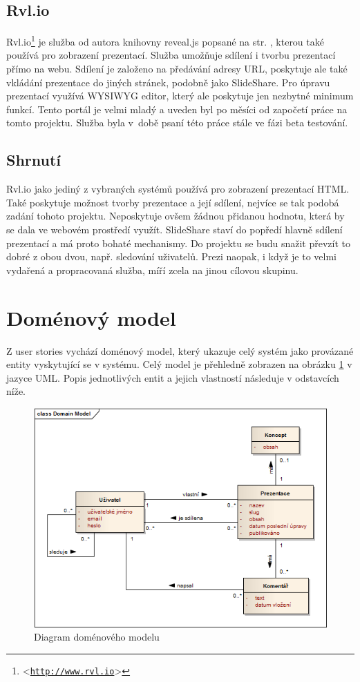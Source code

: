 \documentclass[11pt,twoside,a4paper]{book}
\let\oldUrl\url									%
\renewcommand\url[1]{<\texttt{\oldUrl{#1}}>}
\begin{document}
\subsection{Rvl.io}
Rvl.io\footnote{\url{http://www.rvl.io}} je služba od autora knihovny reveal.js popsané na str. \pageref{chap:revealjs}, kterou také používá pro zobrazení prezentací. Služba umožňuje sdílení i tvorbu prezentací přímo na webu. Sdílení je založeno na předávání adresy URL, poskytuje ale také vkládání prezentace do jiných stránek, podobně jako SlideShare. Pro úpravu prezentací využívá WYSIWYG editor, který ale poskytuje jen nezbytné minimum funkcí. Tento portál je velmi mladý a uveden byl po měsíci od započetí práce na tomto projektu. Služba byla v~době psaní této práce stále ve fázi beta testování.

\subsection{Shrnutí}
Rvl.io jako jediný z vybraných systémů používá pro zobrazení prezentací HTML. Také poskytuje možnost tvorby prezentace a její sdílení, nejvíce se tak podobá zadání tohoto projektu. Neposkytuje ovšem žádnou přidanou hodnotu, která by se dala ve webovém prostředí využít. SlideShare staví do popředí hlavně sdílení prezentací a má proto bohaté mechanismy. Do projektu se budu snažit převzít to dobré z obou dvou, např. sledování uživatelů. Prezi naopak, i když je to velmi vydařená a propracovaná služba, míří zcela na jinou cílovou skupinu. 


\section{Doménový model}
Z user stories vychází doménový model, který ukazuje celý systém jako provázané entity vyskytující se v systému. Celý model je přehledně zobrazen na obrázku \ref{fig:domainModel} v jazyce UML. Popis jednotlivých entit a jejich vlastností následuje v odstavcích níže.

\begin{figure}[ht]
	\begin{center}
		\includegraphics[width=14cm]{PRO-img/domain.png}
		\caption{Diagram doménového modelu}
		\label{fig:domainModel}
	\end{center}
\end{figure}
\end{document}
